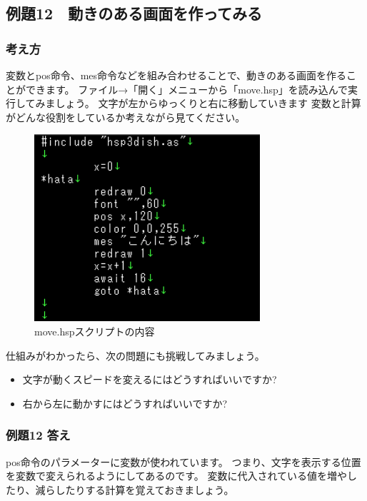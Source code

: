 \clearpage
\subsection{例題12　動きのある画面を作ってみる}

\subsubsection*{考え方}

変数とpos命令、mes命令などを組み合わせることで、動きのある画面を作ることができます。
ファイル→「開く」メニューから「move.hsp」を読み込んで実行してみましょう。
文字が左からゆっくりと右に移動していきます
変数と計算がどんな役割をしているか考えながら見てください。

\begin{figure}[H]
    \begin{center}
        \includegraphics[keepaspectratio,width=8.373cm,height=6.932cm]{text02-img/text02-img050.png}
        \caption{move.hspスクリプトの内容}
    \end{center}
\end{figure}


仕組みがわかったら、次の問題にも挑戦してみましょう。

\begin{itemize}
    \item 文字が動くスピードを変えるにはどうすればいいですか?
    \item 右から左に動かすにはどうすればいいですか?
\end{itemize}

\subsubsection*{例題12 答え}

pos命令のパラメーターに変数が使われています。
つまり、文字を表示する位置を変数で変えられるようにしてあるのです。
変数に代入されている値を増やしたり、減らしたりする計算を覚えておきましょう。

